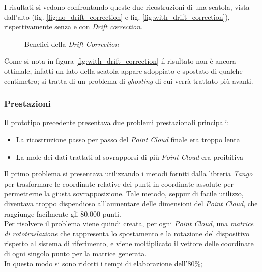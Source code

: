 I risultati si vedono confrontando queste due ricostruzioni di una scatola, vista dall'alto (fig. \ref{fig:no_drift_correction} e fig. \ref{fig:with_drift_correction}), rispettivamente senza e con \emph{Drift correction}.
\begin{figure}[htp] 
    \centering
    \hfill%
    \caption{Benefici della \emph{Drift Correction}}
\end{figure}
\newline
Come si nota in figura \ref{fig:with_drift_correction} il risultato non è ancora ottimale, infatti un lato della scatola appare sdoppiato e spostato di qualche centimetro; si tratta di un problema di \emph{ghosting} di cui verrà trattato più avanti.

\subsubsection{Prestazioni}
Il prototipo precedente presentava due problemi prestazionali principali:
\begin{itemize}
\item La ricostruzione passo per passo del \emph{Point Cloud} finale era troppo lenta
\item La mole dei dati trattati al sovrapporsi di più \emph{Point Cloud} era proibitiva
\end{itemize}
\noindent
Il primo problema si presentava utilizzando i metodi forniti dalla libreria \emph{Tango} per trasformare le coordinate relative dei punti in coordinate assolute per permetterne la giusta sovrapposizione. Tale metodo, seppur di facile utilizzo, diventava troppo dispendioso all'aumentare delle dimensioni del \emph{Point Cloud}, che raggiunge facilmente gli 80.000 punti.\\
Per risolvere il problema viene quindi creata, per ogni \emph{Point Cloud}, una \emph{matrice di rototraslazione} che rappresenta lo spostamento e la rotazione del dispositivo rispetto al sistema di riferimento, e viene moltiplicato il vettore delle coordinate di ogni singolo punto per la matrice generata. \\
In questo modo si sono ridotti i tempi di elaborazione dell'80\%;
\newline

